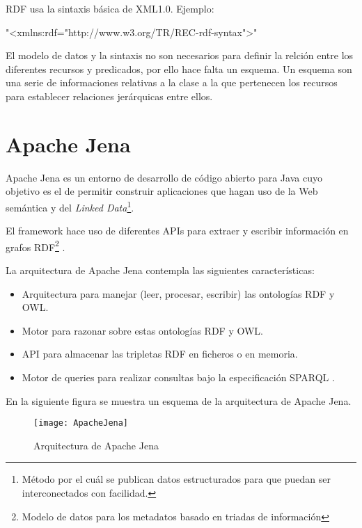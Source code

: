 \newpage
RDF usa la sintaxis básica de XML1.0. Ejemplo: 

"<xmlns:rdf="http://www.w3.org/TR/REC-rdf-syntax">"

El modelo de datos y la sintaxis no son necesarios para definir la relción entre los diferentes recursos y predicados, por ello hace falta un esquema.
Un esquema son una serie de informaciones relativas a la clase a la que pertenecen los recursos para establecer relaciones jerárquicas entre ellos.

\section{Apache Jena}

Apache Jena es un entorno de desarrollo de código abierto para Java cuyo objetivo es el de permitir construir aplicaciones que hagan uso de la Web semántica y del \textit{Linked Data}\footnote{Método por el cuál se publican datos estructurados para que puedan ser interconectados con facilidad.}. 

El framework hace uso de diferentes APIs para extraer y escribir información en grafos RDF\footnote{Modelo de datos para los metadatos basado en triadas de información} \cite{wiki:jena}.

La arquitectura de Apache Jena contempla las siguientes características:

\begin{itemize}
	\item{Arquitectura para manejar (leer, procesar, escribir) las ontologías RDF y OWL.}
	\item{Motor para razonar sobre estas ontologías RDF y OWL.}
	\item{API para almacenar las tripletas RDF en ficheros o en memoria.}
	\item{Motor de queries para realizar consultas bajo la especificación SPARQL \cite{jena}.}
\end{itemize}

En la siguiente figura se muestra un esquema de la arquitectura de Apache Jena.



\begin{figure}[tph]
    \begin{center}%
          \begin{center}%
            \texttt{[image: ApacheJena]}%
            \caption{Arquitectura de Apache Jena}%
            \label{figJena}%
          \end{center}%
    \end{center}%
  \end{figure}%

